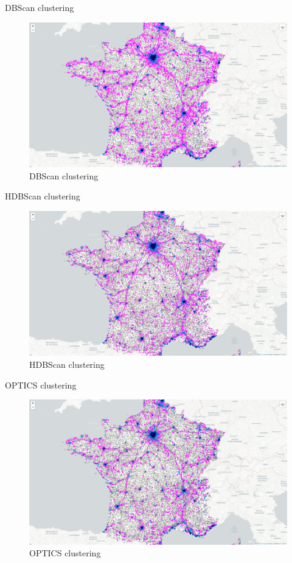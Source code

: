 \begin{frame}{DBScan clustering}
    \begin{figure}
        \includegraphics[height=0.6\paperheight]{images/cartes/road_detection/dbs.png}
        \caption{DBScan clustering}
    \end{figure}
\end{frame}

\begin{frame}{HDBScan clustering}
    \begin{figure}
        \includegraphics[height=0.6\paperheight]{images/cartes/road_detection/hdb.png}
        \caption{HDBScan clustering}
    \end{figure}
\end{frame}

\begin{frame}{OPTICS clustering}
    \begin{figure}
        \includegraphics[height=0.6\paperheight]{images/cartes/road_detection/opt.png}
        \caption{OPTICS clustering}
    \end{figure}
\end{frame}

